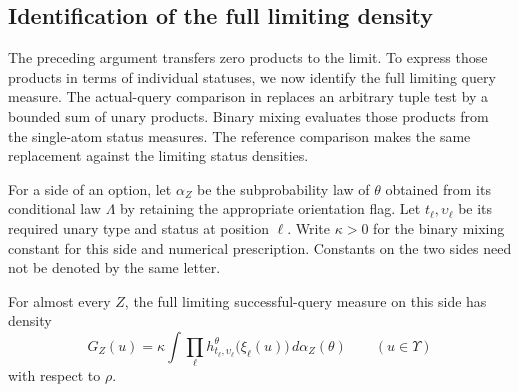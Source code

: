 \subsection{Identification of the full limiting density}

The preceding argument transfers zero products to the limit. To express
those products in terms of individual statuses, we now identify the
full limiting query measure. The actual-query comparison in
 replaces an arbitrary tuple test by a bounded
sum of unary products. Binary mixing evaluates those products from the
single-atom status measures. The reference comparison makes the same
replacement against the limiting status densities.

For a side of an option, let $\alpha_Z$ be the subprobability law of
$\theta$ obtained from its conditional law $\Lambda$ by retaining the
appropriate orientation flag. Let $t_\ell,\upsilon_\ell$ be its required unary
type and status at position $\ell$. Write $\kappa>0$ for the binary
mixing constant for this side and numerical prescription. Constants on
the two sides need not be denoted by the same letter.

\begin{lemma}
\label{lem:limit-density}
For almost every $Z$, the full limiting successful-query measure on
this side has density
\begin{equation}
\label{eq:limit-density}
G_Z(u)=\kappa\int
  \prod_{\ell}h^\theta_{t_\ell,\upsilon_\ell}
                    \bigl(\xi_\ell(u)\bigr)\,d\alpha_Z(\theta)
\qquad (u\in\Upsilon)
\end{equation}
with respect to $\rho$.
\end{lemma}

